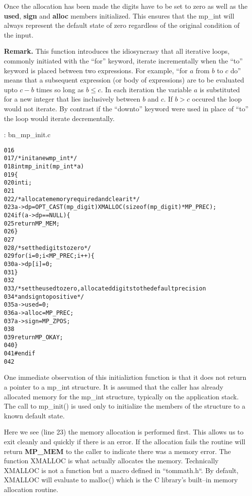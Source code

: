 \documentclass[b5paper]{book}
\begin{document}
Once the allocation has been made the digits have to be set to zero as well as the \textbf{used}, \textbf{sign} and
\textbf{alloc} members initialized.  This ensures that the mp\_int will always represent the default state of zero regardless
of the original condition of the input.

\textbf{Remark.}
This function introduces the idiosyncrasy that all iterative loops, commonly initiated with the ``for'' keyword, iterate incrementally
when the ``to'' keyword is placed between two expressions.  For example, ``for $a$ from $b$ to $c$ do'' means that
a subsequent expression (or body of expressions) are to be evaluated upto $c - b$ times so long as $b \le c$.  In each
iteration the variable $a$ is substituted for a new integer that lies inclusively between $b$ and $c$.  If $b > c$ occured
the loop would not iterate.  By contrast if the ``downto'' keyword were used in place of ``to'' the loop would iterate 
decrementally.

\vspace{+3mm}\begin{small}
\hspace{-5.1mm}{\bf File}: bn\_mp\_init.c
\vspace{-3mm}
\begin{alltt}
016   
017   /* init a new mp_int */
018   int mp_init (mp_int * a)
019   \{
020     int i;
021   
022     /* allocate memory required and clear it */
023     a->dp = OPT_CAST(mp_digit) XMALLOC (sizeof (mp_digit) * MP_PREC);
024     if (a->dp == NULL) \{
025       return MP_MEM;
026     \}
027   
028     /* set the digits to zero */
029     for (i = 0; i < MP_PREC; i++) \{
030         a->dp[i] = 0;
031     \}
032   
033     /* set the used to zero, allocated digits to the default precision
034      * and sign to positive */
035     a->used  = 0;
036     a->alloc = MP_PREC;
037     a->sign  = MP_ZPOS;
038   
039     return MP_OKAY;
040   \}
041   #endif
042   
\end{alltt}
\end{small}

One immediate observation of this initializtion function is that it does not return a pointer to a mp\_int structure.  It 
is assumed that the caller has already allocated memory for the mp\_int structure, typically on the application stack.  The 
call to mp\_init() is used only to initialize the members of the structure to a known default state.  

Here we see (line 23) the memory allocation is performed first.  This allows us to exit cleanly and quickly
if there is an error.  If the allocation fails the routine will return \textbf{MP\_MEM} to the caller to indicate there
was a memory error.  The function XMALLOC is what actually allocates the memory.  Technically XMALLOC is not a function
but a macro defined in ``tommath.h``.  By default, XMALLOC will evaluate to malloc() which is the C library's built--in
memory allocation routine.
\end{document}
